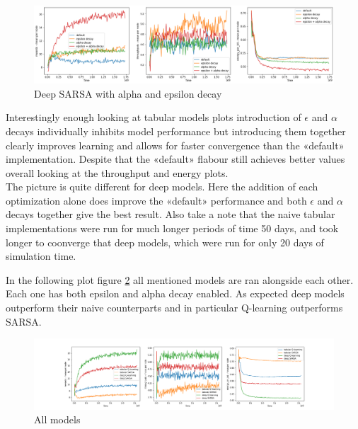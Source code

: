 \begin{figure}[H]
\centering
\hspace*{-1.1cm}  
\includegraphics[scale=0.40]{plots/decays/deep_sarsa_decay_SMALL.png}
  \caption{Deep SARSA with alpha and epsilon decay}
  \label{fig:deep_sarsa_decays}
\end{figure}

Interestingly enough looking at tabular models plots
introduction of $\epsilon$ and $\alpha$ decays 
individually inhibits model performance but introducing
them together clearly improves learning and allows for 
faster convergence than the «default» implementation.
Despite that the «default» flabour still achieves 
better values overall looking at the throughput and 
energy plots. \\

The picture is quite different for deep models. Here
the addition of each optimization alone does improve
the «default» performance and both $\epsilon$ and
$\alpha$ decays together give the best result. Also 
take a note that the naive tabular implementations 
were run for much longer periods of time 50 days, and
took longer to coonverge that deep models, which were run for only 20 days of simulation time. 

In the following plot figure \ref{fig:all_decays} all mentioned models are ran 
alongside each other. Each one has both epsilon and alpha
decay enabled. As expected deep models outperform their
naive counterparts and in particular Q-learning 
outperforms SARSA.

\begin{figure}[H]
\centering
\hspace*{-3.3cm}  
\includegraphics[scale=0.40]{plots/decays/all_decay_SMALL.png}
  \caption{All models}
  \label{fig:all_decays}
\end{figure}

